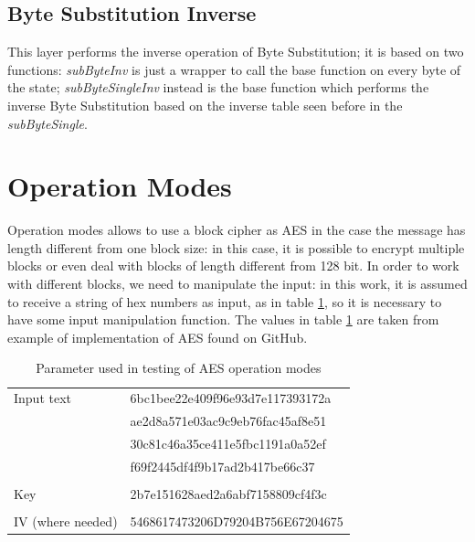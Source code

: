 \documentclass{article}
\begin{document}
\subsection{Byte Substitution Inverse}

This layer performs the inverse operation of Byte Substitution; it is based on two functions: \textit{subByteInv} is just a wrapper to call the base function on every byte of the state; \textit{subByteSingleInv} instead is the base function which performs the inverse Byte Substitution based on the inverse table seen before in the \textit{subByteSingle}.
 

\section{Operation Modes}

Operation modes allows to use a block cipher as AES in the case the message has length different from one block size: in this case, it is possible to encrypt multiple blocks or even deal with blocks of length different from 128 bit. In order to work with different blocks, we need to manipulate the input: in this work, it is assumed to receive a string of hex numbers as input, as in table \ref{tab:AESparameter}, so it is necessary to have some input manipulation function.\newline
The values in table \ref{tab:AESparameter} are taken from example of implementation of AES found on GitHub.

\begin{table}[H]
\begin{center}
\begin{tabular}{ll}
Input text &  6bc1bee22e409f96e93d7e117393172a\\
	      &   ae2d8a571e03ac9c9eb76fac45af8e51\\
	      &   30c81c46a35ce411e5fbc1191a0a52ef\\
	      &   f69f2445df4f9b17ad2b417be66c37 \\
\\
Key & 2b7e151628aed2a6abf7158809cf4f3c\\
\\
IV (where needed) & 5468617473206D79204B756E67204675
\end{tabular}
\caption{Parameter used in testing of AES operation modes}
\label{tab:AESparameter}
\end{center}
\end{table}
\end{document}
